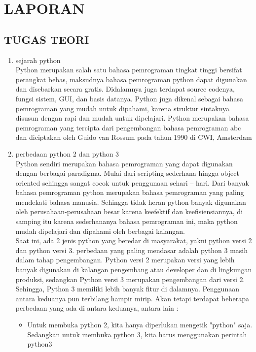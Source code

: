 \chapter{LAPORAN}
\section{TUGAS TEORI}
\begin{enumerate}
	\item sejarah python\\
Python merupakan salah satu  bahasa pemrograman tingkat tinggi bersifat perangkat bebas, maksudnya bahasa pemrograman python dapat digunakan dan disebarkan secara gratis. Didalamnya juga terdapat source codenya, fungsi sistem, GUI, dan basis datanya.  Python juga dikenal sebagai bahasa pemrograman yang mudah untuk dipahami, karena struktur sintaknya disusun dengan rapi dan mudah untuk dipelajari.
Python merupakan bahasa pemrograman yang tercipta dari pengembangan bahasa pemrograman abc dan diciptakan oleh Guido van Rossum pada tahun 1990 di CWI, Amsterdam 
	\item perbedaan python 2 dan python 3\\
Python sendiri merupakan bahasa pemrograman yang dapat digunakan dengan berbagai paradigma. Mulai dari scripting sederhana hingga object oriented sehingga sangat cocok untuk penggunaan sehari – hari. Dari banyak bahasa pemrograman python merupakan bahasa pemrograman yang paling mendekati bahasa manusia. Sehingga tidak heran python banyak digunakan oleh perusahaan-perusahaan besar karena keefektif dan keefisiensiannya, di samping itu karena sederhananya bahasa pemrograman ini, maka python mudah dipelajari dan dipahami oleh berbagai kalangan.\\
Saat ini, ada 2 jenis python yang beredar di masyarakat, yakni python versi 2 dan python versi 3. perbedaan yang paling mendasar adalah python 3 masih dalam tahap pengembangan. Python versi 2 merupakan versi yang lebih banyak digunakan di kalangan pengembang atau developer dan di lingkungan produksi, sedangkan Python versi 3 merupakan pengembangan dari versi 2. Sehingga, Python 3 memiliki lebih banyak fitur di dalamnya. Penggunaan antara keduanya pun terbilang hampir mirip. Akan tetapi terdapat beberapa perbedaan yang ada di antara keduanya, antara lain :\\
	\begin{itemize}
		\item Untuk membuka python 2, kita hanya diperlukan mengetik "python" saja. Sedangkan untuk membuka python 3, kita harus menggunakan perintah python3

\end{itemize}
\end{enumerate}
